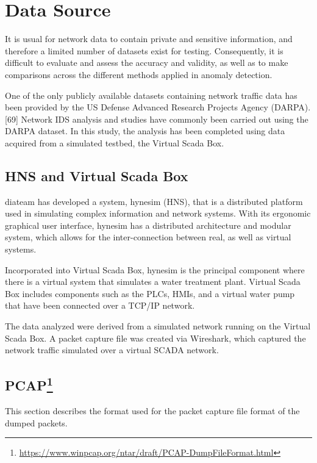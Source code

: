 \documentclass[11pt,a4paper]{article}
\let\rmarkdownfootnote\footnote%
\def\footnote{\protect\rmarkdownfootnote}
\begin{document}
\clearpage

\section{Data Source}\label{data-source}

It is usual for network data to contain private and sensitive
information, and therefore a limited number of datasets exist for
testing. Consequently, it is difficult to evaluate and assess the
accuracy and validity, as well as to make comparisons across the
different methods applied in anomaly detection.

One of the only publicly available datasets containing network traffic
data has been provided by the US Defense Advanced Research Projects
Agency (DARPA).{[}69{]} Network IDS analysis and studies have commonly
been carried out using the DARPA dataset. In this study, the analysis
has been completed using data acquired from a simulated testbed, the
Virtual Scada Box.

\subsection{HNS and Virtual Scada Box}\label{hns-and-virtual-scada-box}

diateam has developed a system, hynesim (HNS), that is a distributed
platform used in simulating complex information and network systems.
With its ergonomic graphical user interface, hynesim has a distributed
architecture and modular system, which allows for the inter-connection
between real, as well as virtual systems.

Incorporated into Virtual Scada Box, hynesim is the principal component
where there is a virtual system that simulates a water treatment plant.
Virtual Scada Box includes components such as the PLCs, HMIs, and a
virtual water pump that have been connected over a TCP/IP network.

The data analyzed were derived from a simulated network running on the
Virtual Scada Box. A packet capture file was created via Wireshark,
which captured the network traffic simulated over a virtual SCADA
network.

\subsection[PCAP]{PCAP\footnote{\url{https://www.winpcap.org/ntar/draft/PCAP-DumpFileFormat.html}}}\label{pcap2}

This section describes the format used for the packet capture file
format of the dumped packets.
\end{document}
